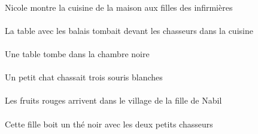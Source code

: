 \begin{exe}
\INDSgErgP{}   \NicoleDSgErgP{}    \DEFPlDatP{}    \DEFPlOblP{}   \infirmiereBPlOblP{}   \DEP{}   \filleCPlDatP{}   \DEFSgAbsP{}    \DEFSgOblP{}   \maisonDSgOblP{}   \DEP{}   \cuisineCSgAbsP{}  \montrerVdPrsCSgP{}\\
Nicole montre la cuisine de la maison aux filles des infirmières
\ex\gll
\DEFSgAbs{}    \DEFPlObl{}   \balaiCPlObl{}   \AVEC{}   \tableCSgAbs{}    \DEFPlObl{}    \DEFSgObl{}   \cuisineCSgObl{}   \DANS{}   \chasseurCPlObl{}   \DEVANT{}  \tomberViPstCSg{}\\
\DEFSgAbsP{}    \DEFPlOblP{}   \balaiCPlOblP{}   \AVECP{}   \tableCSgAbsP{}    \DEFPlOblP{}    \DEFSgOblP{}   \cuisineCSgOblP{}   \DANSP{}   \chasseurCPlOblP{}   \DEVANTP{}  \tomberViPstCSgP{}\\
La table avec les balais tombait devant les chasseurs dans la cuisine
\ex\gll
\DEFSgObl{}   \noirBSg{}   \chambreBSgObl{}   \DANS{}   \INDSgAbs{}   \tableCSgAbs{}  \tomberViPrsCSg{}\\
\DEFSgOblP{}   \noirBSgP{}   \chambreBSgOblP{}   \DANSP{}   \INDSgAbsP{}   \tableCSgAbsP{}  \tomberViPrsCSgP{}\\
Une table tombe dans la chambre noire
\ex\gll
\INDSgErg{}   \petitDSg{}   \chatDSgErg{}   \INDPlAbs{}   \troisAPl{}   \blancAPl{}   \sourisAPlAbs{}  \chasserVtPstAPl{}\\
\INDSgErgP{}   \petitDSgP{}   \chatDSgErgP{}   \INDPlAbsP{}   \troisAPlP{}   \blancAPlP{}   \sourisAPlAbsP{}  \chasserVtPstAPlP{}\\
Un petit chat chassait trois souris blanches
\ex\gll
\DEFPlAbs{}   \rougeBPl{}   \fruitBPlAbs{}    \DEFSgObl{}    \DEFSgObl{}    \INDSgObl{}   \NabilBSgObl{}   \DE{}   \filleCSgObl{}   \DE{}   \villageASgObl{}   \DANS{}  \arriverViPrsBPl{}\\
\DEFPlAbsP{}   \rougeBPlP{}   \fruitBPlAbsP{}    \DEFSgOblP{}    \DEFSgOblP{}    \INDSgOblP{}   \NabilBSgOblP{}   \DEP{}   \filleCSgOblP{}   \DEP{}   \villageASgOblP{}   \DANSP{}  \arriverViPrsBPlP{}\\
Les fruits rouges arrivent dans le village de la fille de Nabil
\ex\gll
\DEFDuObl{}   \petitCDu{}   \chasseurCDuObl{}   \AVEC{}   \DEMSgErg{}   \filleCSgErg{}   \INDSgAbs{}   \noirBSg{}   \theBSgAbs{}  \boireVtPrsBSg{}\\
\DEFDuOblP{}   \petitCDuP{}   \chasseurCDuOblP{}   \AVECP{}   \DEMSgErgP{}   \filleCSgErgP{}   \INDSgAbsP{}   \noirBSgP{}   \theBSgAbsP{}  \boireVtPrsBSgP{}\\
Cette fille boit un thé noir avec les deux petits chasseurs
\ex\gll
\DEFDuAbs{}   \blancDDu{}   \chatDDuAbs{}    \DEFSgObl{}   \basCSg{}   \tableCSgObl{}   \SUR{}  \dormirViPrsDDu{}\\

\end{exe}
